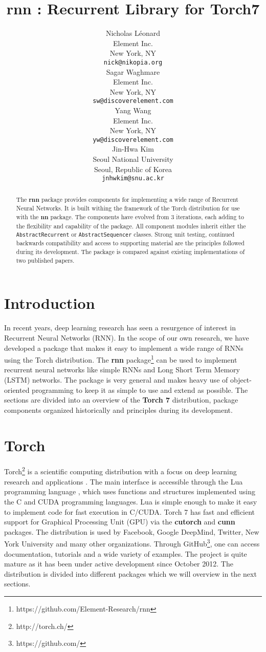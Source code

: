 \documentclass{article} %
\title{rnn : Recurrent Library for Torch7}
\author{
Nicholas L\'{e}onard \\
Element Inc.\\
New York, NY \\
\texttt{nick@nikopia.org} \\
\And
Sagar Waghmare \\
Element Inc.\\
New York, NY \\
\texttt{sw@discoverelement.com} \\
\And
Yang Wang \\
Element Inc.\\
New York, NY \\
\texttt{yw@discoverelement.com} \\
\And
Jin-Hwa Kim \\
Seoul National University \\
Seoul, Republic of Korea \\
\texttt{jnhwkim@snu.ac.kr} \\
}
\providecommand{\inlinecode}[1]{\texttt{#1}}
\begin{document}
\maketitle

\begin{abstract}
The \textbf{rnn} package provides components for 
implementing a wide range of Recurrent Neural Networks.
It is built withing the framework of the Torch distribution
for use with the \textbf{nn} package.
The components have evolved from 3 iterations, each 
adding to the flexibility and capability of the package.
All component modules inherit either the \inlinecode{AbstractRecurrent}
or \inlinecode{AbstractSequencer} classes.
Strong unit testing, continued backwards compatibility and access to supporting material
are the principles followed during its development.
The package is compared against existing implementations of two published papers.
\end{abstract}

\section{Introduction}
In recent years, deep learning research has seen a resurgence of interest 
in Recurrent Neural Networks (RNN). In the scope of our own research, we
have developed a package that makes it easy to implement a wide range of RNNs using the 
Torch distribution. 
The \textbf{rnn} package\footnote{https://github.com/Element-Research/rnn} 
can be used to implement recurrent neural networks 
like simple RNNs and Long Short Term Memory (LSTM) networks.
The package is very general and makes heavy use 
of object-oriented programming to keep it as simple to use and extend as possible.
The sections are divided into an overview of the \textbf{Torch 7} distribution, 
package components organized historically and principles during its development.

\section{Torch}

Torch\footnote{http://torch.ch/} is a scientific computing distribution 
with a focus on deep learning research and applications \cite{collobert2011torch7}.
The main interface is accessible through the Lua programming language \cite{ierusalimschy1996lua},
which uses functions and structures implemented using the C and CUDA programming languages.
Lua is simple enough to make it easy to implement code for fast execution in C/CUDA. 
Torch 7 has fast and efficient support for Graphical Processing Unit (GPU)
via the \textbf{cutorch} and \textbf{cunn} packages. 
The distribution is used by Facebook, Google DeepMind, Twitter, New York University and 
many other organizations. Through GitHub\footnote{https://github.com/}, one can access documentation, tutorials and 
a wide variety of examples. The project is quite mature as it has been under active
development since October 2012. The distribution is divided into different packages 
which we will overview in the next sections.
\end{document}
